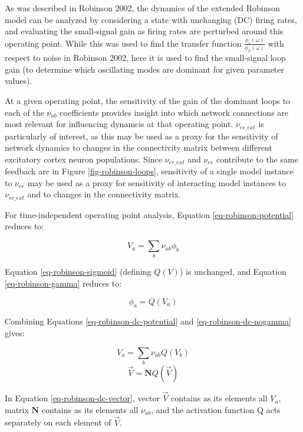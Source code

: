 As was described in Robinson 2002, the dynamics of the extended Robinson
model can be analyzed by considering a state with unchanging (DC) firing
rates, and evaluating the small-signal gain as firing rates are perturbed
around this operating point. While this was used to find the transfer
function $\frac{\phi_e(\omega)}{\phi_n(\omega)}$ with respect to noise in
Robinson 2002, here it is used to find the small-signal loop gain (to
determine which oscillating modes are dominant for given parameter values).

At a given operating point, the sensitivity of the gain of the dominant
loops to each of the $\nu_{ab}$ coefficients provides insight into which
network connections are most relevant for influencing dynamcis at that
operating point. $\nu_{ee\_ext}$ is particularly of interest, as this
may be used as a proxy for the sensitivity of network dynamics to changes
in the connectivity matrix between different excitatory cortex neuron
populations. Since $\nu_{ee\_ext}$ and $\nu_{ee}$ contribute to the same
feedback arc in Figure \ref{fig-robinson-loops}, sensitivity of a single
model instance to $\nu_{ee}$ may be used as a proxy for sensitivity of
interacting model instances to $\nu_{ee\_ext}$ and to changes in the
connectivity matrix.

For time-independent operating point analysis, Equation
\ref{eq-robinson-potential} reduces to:

\begin{equation}
V_a = \sum_b \nu_{ab} \phi_b
\label{eq-robinson-dc-potential}
\end{equation}

Equation \ref{eq-robinson-sigmoid} (defining $Q(V)$) is unchanged, and
Equation \ref{eq-robinson-gamma} reduces to:

\begin{equation}
\phi_a = Q(V_a)
\label{eq-robinson-dc-nogamma}
\end{equation}

Combining Equations \ref{eq-robinson-dc-potential} and
\ref{eq-robinson-dc-nogamma} gives:

\begin{equation}
V_a = \sum_b \nu_{ab} Q(V_b)
\label{eq-robinson-dc-scalar}
\end{equation}
%
\begin{equation}
\vec{V} = \mathbf{N} Q(\vec{V})
\label{eq-robinson-dc-vector}
\end{equation}

In Equation \ref{eq-robinson-dc-vector}, vector $\vec{V}$ contains as its
elements all $V_a$, matrix $\mathbf{N}$ contains as its elements all
$\nu_{ab}$, and the activation function Q acts separately on each element
of $\vec{V}$.

